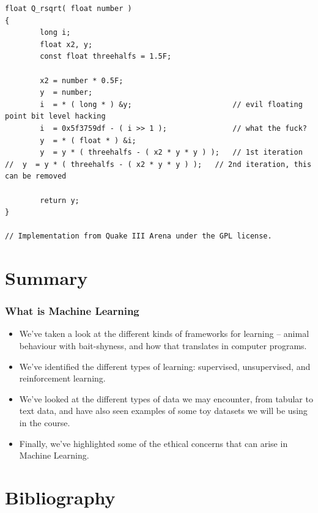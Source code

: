 \documentclass[10pt]{beamer}
\begin{document}
\begin{verbatim}
float Q_rsqrt( float number )
{
        long i;
        float x2, y;
        const float threehalfs = 1.5F;

        x2 = number * 0.5F;
        y  = number;
        i  = * ( long * ) &y;                       // evil floating point bit level hacking
        i  = 0x5f3759df - ( i >> 1 );               // what the fuck? 
        y  = * ( float * ) &i;
        y  = y * ( threehalfs - ( x2 * y * y ) );   // 1st iteration
//	y  = y * ( threehalfs - ( x2 * y * y ) );   // 2nd iteration, this can be removed

        return y;
}

// Implementation from Quake III Arena under the GPL license.
\end{verbatim}

\section*{Summary}
\label{sec:orgdf23a7a}

\subsubsection*{What is Machine Learning}
\label{sec:org1243075}

\begin{itemize}
\item We've taken a look at the different kinds of frameworks for learning -- animal
behaviour with bait-shyness, and how that translates in computer programs.
\item We've identified the different types of learning: supervised, unsupervised, and
reinforcement learning.
\item We've looked at the different types of data we may encounter, from tabular to text
data, and have also seen examples of some toy datasets we will be using in the course.
\item Finally, we've highlighted some of the ethical concerns that can arise in Machine
Learning.
\end{itemize}

\section*{Bibliography}
\label{sec:org7fa864a}
\end{document}

